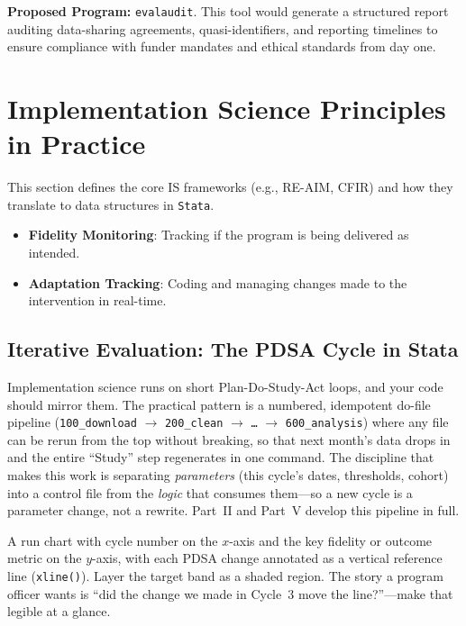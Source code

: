 \documentclass[
    a4paper,
    fontsize=10pt,
    twoside=true,
    numbers=noenddot,
]{kaobook}
\providecommand{\Environment}[1]{\texttt{#1}}
\newenvironment{vizcallout}[1][Visualization to build]{%
    \begin{vizbox}[frametitle={#1}]%
}{%
    \end{vizbox}%
}
\begin{document}
\begin{kaobox}[frametitle=Ado-file Idea: \texttt{evalaudit}]
\textbf{Proposed Program:} \texttt{evalaudit}. This tool would generate a structured report auditing data-sharing agreements, quasi-identifiers, and reporting timelines to ensure compliance with funder mandates and ethical standards from day one.
\end{kaobox}

\section{Implementation Science Principles in Practice}
This section defines the core IS frameworks (e.g., RE-AIM, CFIR) and how they translate to data structures in \Environment{Stata}.
\begin{itemize}
    \item \textbf{Fidelity Monitoring}: Tracking if the program is being delivered as intended.
    \item \textbf{Adaptation Tracking}: Coding and managing changes made to the intervention in real-time.
\end{itemize}

\subsection{Iterative Evaluation: The PDSA Cycle in Stata}
Implementation science runs on short Plan-Do-Study-Act loops, and your code should mirror them. The practical pattern is a numbered, idempotent do-file pipeline (\texttt{100\_download} $\rightarrow$ \texttt{200\_clean} $\rightarrow$ \texttt{\dots} $\rightarrow$ \texttt{600\_analysis}) where any file can be rerun from the top without breaking, so that next month's data drops in and the entire \enquote{Study} step regenerates in one command. The discipline that makes this work is separating \emph{parameters} (this cycle's dates, thresholds, cohort) into a control file from the \emph{logic} that consumes them---so a new cycle is a parameter change, not a rewrite. Part~II and Part~V develop this pipeline in full.

\begin{vizcallout}[Visualization to build: the PDSA run chart]
A run chart with cycle number on the $x$-axis and the key fidelity or outcome metric on the $y$-axis, with each PDSA change annotated as a vertical reference line (\texttt{xline()}). Layer the target band as a shaded region. The story a program officer wants is \enquote{did the change we made in Cycle~3 move the line?}---make that legible at a glance.
\end{vizcallout}
\end{document}
